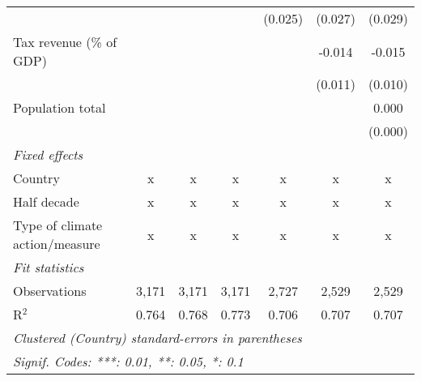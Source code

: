 \begin{tabular}{lcccccc}
                                                            &              &              &               & (0.025)       & (0.027)       & (0.029)\\   
   Tax revenue (\% of GDP)                                  &              &              &               &               & -0.014        & -0.015\\   
                                                            &              &              &               &               & (0.011)       & (0.010)\\   
   Population total                                         &              &              &               &               &               & 0.000\\   
                                                            &              &              &               &               &               & (0.000)\\   
   \emph{Fixed effects}\\
   Country                                                  & x            & x            & x             & x             & x             & x\\  
   Half decade                                              & x            & x            & x             & x             & x             & x\\  
   Type of climate action/measure                           & x            & x            & x             & x             & x             & x\\  
   \midrule \emph{Fit statistics}\\
   Observations                                             & 3,171        & 3,171        & 3,171         & 2,727         & 2,529         & 2,529\\  
   R$^2$                                                    & 0.764        & 0.768        & 0.773         & 0.706         & 0.707         & 0.707\\  
   \midrule
   \multicolumn{7}{l}{\emph{Clustered (Country) standard-errors in parentheses}}\\
   \multicolumn{7}{l}{\emph{Signif. Codes: ***: 0.01, **: 0.05, *: 0.1}}\\
\end{tabular}
\par\endgroup



